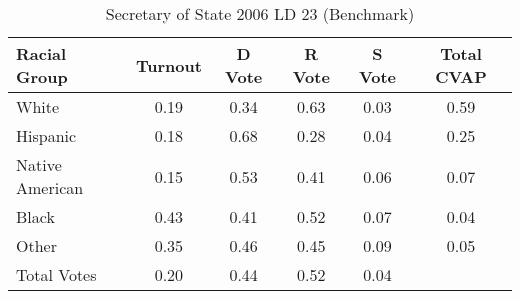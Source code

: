 \begin{table}[htb]
\begin{center}
\caption{Secretary of State 2006 LD 23 (Benchmark)}
\label{sos06_cvap_ld_23_benchmark}
\begin{tabular}{lccccc}
  \hline
Racial Group & Turnout & D Vote & R Vote & S Vote & Total CVAP \\ 
  \hline
White & 0.19 & 0.34 & 0.63 & 0.03 & 0.59 \\ 
  Hispanic & 0.18 & 0.68 & 0.28 & 0.04 & 0.25 \\ 
  Native American & 0.15 & 0.53 & 0.41 & 0.06 & 0.07 \\ 
  Black & 0.43 & 0.41 & 0.52 & 0.07 & 0.04 \\ 
  Other & 0.35 & 0.46 & 0.45 & 0.09 & 0.05 \\ 
  Total Votes & 0.20 & 0.44 & 0.52 & 0.04 &  \\ 
   \hline
\end{tabular}
\end{center}
\end{table}
